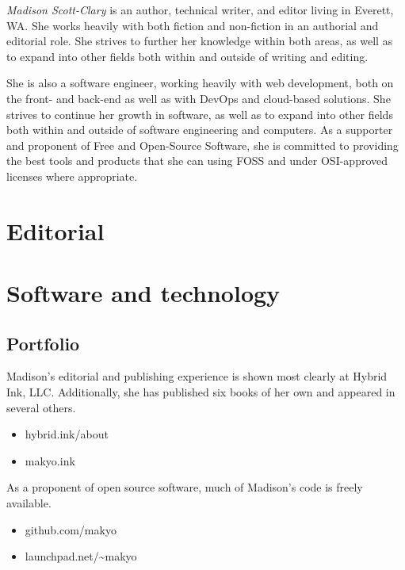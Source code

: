 \documentclass[letterpaper]{memoir}
\begin{document}


\noindent\textit{\large Madison Scott-Clary} is an author, technical writer, and editor living in Everett, WA. She works heavily with both fiction and non-fiction in an authorial and editorial role. She strives to further her knowledge within both areas, as well as to expand into other fields both within and outside of writing and editing.

\noindent She is also a software engineer, working heavily with web development, both on the front- and back-end as well as with DevOps and cloud-based solutions. She strives to continue her growth in software, as well as to expand into other fields both within and outside of software engineering and computers. As a supporter and proponent of Free and Open-Source Software, she is committed to providing the best tools and products that she can using FOSS and under OSI-approved licenses where appropriate.


\section*{Editorial}



\section*{Software and technology}



\subsection{Portfolio}

\begin{description}
  \tightlist
  \item[Writing] Madison's editorial and publishing experience is shown most clearly at Hybrid Ink, LLC. Additionally, she has published six books of her own and appeared in several others.

  \begin{itemize}
    \tightlist
    \item hybrid.ink/about
    \item makyo.ink
  \end{itemize}
  \item[Tech] As a proponent of open source software, much of Madison's code is freely available.

  \begin{itemize}
    \tightlist
    \item github.com/makyo
    \item launchpad.net/\textasciitilde{}makyo
  \end{itemize}
\end{description}
\end{document}
